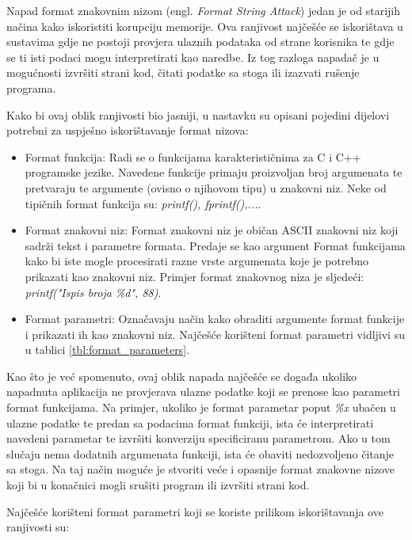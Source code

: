\documentclass[times, utf8, diplomski, numeric]{fer}
\begin{document}
Napad format znakovnim nizom (engl. \emph{Format String Attack})
jedan je od starijih načina kako iskoristiti korupciju memorije.
Ova ranjivost najčešće se iskorištava u sustavima gdje ne postoji
provjera ulaznih podataka od strane korisnika te gdje se ti isti
podaci mogu interpretirati kao naredbe. Iz tog razloga napadač je
u mogućnosti izvršiti strani kod, čitati podatke sa stoga ili
izazvati rušenje programa. 

Kako bi ovaj oblik ranjivosti bio jasniji, u nastavku su opisani
pojedini dijelovi potrebni za uspješno iskorištavanje format
nizova:

\begin{itemize}
\item Format funkcija: Radi se o funkcijama karakterističnima za
C i C++ programske jezike. Navedene funkcije primaju proizvoljan
broj argumenata te pretvaraju te argumente (ovisno o njihovom
tipu) u znakovni niz. Neke od tipičnih format funkcija su:
\emph{printf(), fprintf(),...}. 

\item Format znakovni niz: Format znakovni niz je običan ASCII
znakovni niz koji sadrži tekst i parametre formata. Predaje se
kao argument Format funkcijama kako bi iste mogle procesirati
razne vrste argumenata koje je potrebno prikazati kao znakovni
niz. Primjer format znakovnog niza je sljedeći:
\emph{printf("Ispis broja \%d", 88)}.

\item Format parametri: Označavaju način kako obraditi argumente
format funkcije i prikazati ih kao znakovni niz. Najčešće
korišteni format parametri vidljivi su u tablici
\ref{tbl:format_parameters}.
\end{itemize}

Kao što je već spomenuto, ovaj oblik napada najčešće se događa
ukoliko napadnuta aplikacija ne provjerava ulazne podatke koji se
prenose kao parametri format funkcijama. Na primjer, ukoliko je
format parametar poput \emph{\%x} ubačen u ulazne podatke te
predan sa podacima format funkciji, ista će interpretirati
navedeni parametar te izvršiti konverziju specificiranu
parametrom. Ako u tom slučaju nema dodatnih argumenata funkciji,
ista će obaviti nedozvoljeno čitanje sa stoga. Na taj način
moguće je stvoriti veće i opasnije format znakovne nizove koji bi
u konačnici mogli srušiti program ili izvršiti strani kod.

Najčešće korišteni format parametri koji se koriste prilikom
iskorištavanja ove ranjivosti su:
\end{document}
